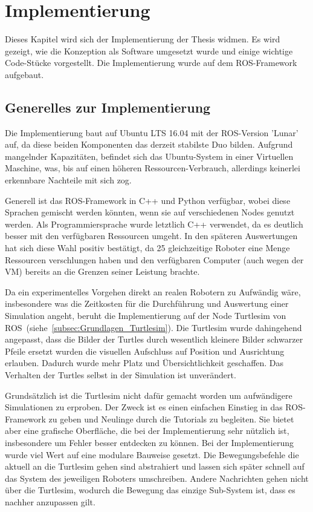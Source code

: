 \chapter{Implementierung}\label{ch:Implementierung}

Dieses Kapitel wird sich der Implementierung der Thesis widmen. Es wird gezeigt, wie die Konzeption als Software umgesetzt wurde und einige wichtige Code-Stücke vorgestellt. Die Implementierung wurde auf dem \ac{ROS}-Framework aufgebaut.

\section{Generelles zur Implementierung}
Die Implementierung baut auf Ubuntu LTS 16.04 mit der \ac{ROS}-Version 'Lunar' auf, da diese beiden Komponenten das derzeit stabilste Duo bilden. Aufgrund mangelnder Kapazitäten, befindet sich das Ubuntu-System in einer Virtuellen Maschine, was, bis auf einen höheren Ressourcen-Verbrauch, allerdings keinerlei erkennbare Nachteile mit sich zog.

Generell ist das \ac{ROS}-Framework in C++ und Python verfügbar, wobei diese Sprachen gemischt werden könnten, wenn sie auf verschiedenen Nodes genutzt werden. Als Programmiersprache wurde letztlich C++ verwendet, da es deutlich besser mit den verfügbaren Ressourcen umgeht. In den späteren Auswertungen hat sich diese Wahl positiv bestätigt, da 25 gleichzeitige Roboter eine Menge Ressourcen verschlungen haben und den verfügbaren Computer (auch wegen der VM) bereits an die Grenzen seiner Leistung brachte.

Da ein experimentelles Vorgehen direkt an realen Robotern zu Aufwändig wäre, insbesondere was die Zeitkosten für die Durchführung und Auswertung einer Simulation angeht, beruht die Implementierung auf der Node Turtlesim\cite{ROS_TURTLESIM} von ROS~(siehe~\autoref{subsec:Grundlagen_Turtlesim}). Die Turtlesim wurde dahingehend angepasst, dass die Bilder der Turtles durch wesentlich kleinere Bilder schwarzer Pfeile ersetzt wurden die visuellen Aufschluss auf Position und Ausrichtung erlauben. Dadurch wurde mehr Platz und Übersichtlichkeit geschaffen. Das Verhalten der Turtles selbst in der Simulation ist unverändert.

Grundsätzlich ist die Turtlesim nicht dafür gemacht worden um aufwändigere Simulationen zu erproben. Der Zweck ist es einen einfachen Einstieg in das \ac{ROS}-Framework zu geben und Neulinge durch die Tutorials zu begleiten. Sie bietet aber eine grafische Oberfläche, die bei der Implementierung sehr nützlich ist, insbesondere um Fehler besser entdecken zu können.
Bei der Implementierung wurde viel Wert auf eine modulare Bauweise gesetzt. Die Bewegungsbefehle die aktuell an die Turtlesim gehen sind abstrahiert und lassen sich später schnell auf das System des jeweiligen Roboters umschreiben. Andere Nachrichten gehen nicht über die Turtlesim, wodurch die Bewegung das einzige Sub-System ist, dass es nachher anzupassen gilt.

